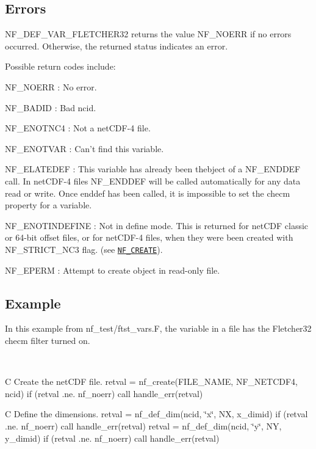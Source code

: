 \subsection*{Errors }

N\+F\+\_\+\+D\+E\+F\+\_\+\+V\+A\+R\+\_\+\+F\+L\+E\+T\+C\+H\+E\+R32 returns the value N\+F\+\_\+\+N\+O\+E\+RR if no errors occurred. Otherwise, the returned status indicates an error.

Possible return codes include\+:

{\ttfamily N\+F\+\_\+\+N\+O\+E\+RR} \+: No error.

{\ttfamily N\+F\+\_\+\+B\+A\+D\+ID} \+: Bad ncid.

{\ttfamily N\+F\+\_\+\+E\+N\+O\+T\+N\+C4} \+: Not a net\+C\+D\+F-\/4 file.

{\ttfamily N\+F\+\_\+\+E\+N\+O\+T\+V\+AR} \+: Can’t find this variable.

{\ttfamily N\+F\+\_\+\+E\+L\+A\+T\+E\+D\+EF} \+: This variable has already been thebject of a N\+F\+\_\+\+E\+N\+D\+D\+EF call. In net\+C\+D\+F-\/4 files N\+F\+\_\+\+E\+N\+D\+D\+EF will be called automatically for any data read or write. Once enddef has been called, it is impossible to set the checm property for a variable.

{\ttfamily N\+F\+\_\+\+E\+N\+O\+T\+I\+N\+D\+E\+F\+I\+NE} \+: Not in define mode. This is returned for net\+C\+DF classic or 64-\/bit offset files, or for net\+C\+D\+F-\/4 files, when they were been created with N\+F\+\_\+\+S\+T\+R\+I\+C\+T\+\_\+\+N\+C3 flag. (see \href{#NF_005fCREATE}{\tt N\+F\+\_\+\+C\+R\+E\+A\+TE}).

{\ttfamily N\+F\+\_\+\+E\+P\+E\+RM} \+: Attempt to create object in read-\/only file.

\subsection*{Example }

In this example from nf\+\_\+test/ftst\+\_\+vars.\+F, the variable in a file has the Fletcher32 checm filter turned on.

 

C Create the net\+C\+DF file. retval = nf\+\_\+create(\+F\+I\+L\+E\+\_\+\+N\+A\+M\+E, N\+F\+\_\+\+N\+E\+T\+C\+D\+F4, ncid) if (retval .ne. nf\+\_\+noerr) call handle\+\_\+err(retval)

C Define the dimensions. retval = nf\+\_\+def\+\_\+dim(ncid, \char`\"{}x\char`\"{}, NX, x\+\_\+dimid) if (retval .ne. nf\+\_\+noerr) call handle\+\_\+err(retval) retval = nf\+\_\+def\+\_\+dim(ncid, \char`\"{}y\char`\"{}, NY, y\+\_\+dimid) if (retval .ne. nf\+\_\+noerr) call handle\+\_\+err(retval)

